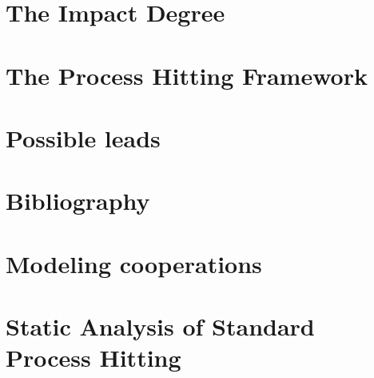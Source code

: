 \documentclass[fleqn,8pt,c]{beamer}
\begin{document}
\section{The Impact Degree}


\section{The Process Hitting Framework}




\section{Possible leads}



\appendix
{}
\setcounter{finalframe}{\value{framenumber}}

\section[x]{Bibliography}


\section{Modeling cooperations}


\section{Static Analysis of Standard Process Hitting}



\setcounter{framenumber}{\value{finalframe}}
\end{document}
